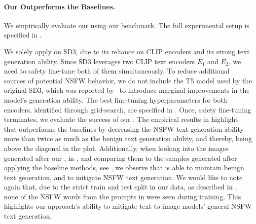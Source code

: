 \paragraph{Our \ours Outperforms the Baselines.}
We empirically evaluate our \ours using our \bench benchmark. The full experimental setup is specified in .

We solely apply \ours on SD3, due to its reliance on CLIP encoders and its strong text generation ability. 
Since SD3 leverages two CLIP text encoders \textit{$E_1$} and \textit{$E_2$}, we need to safety fine-tune both of them simultaneously. 
To reduce additional sources of potential NSFW behavior, we do not include the T5 model used by the original SD3, which was reported by~\citet{esser2024scalingSD3} to introduce marginal improvements in the model's generation ability.
The best fine-tuning hyperparameters for both encoders, identified through grid-search, are specified in .
Once, safety fine-tuning terminates, we evaluate the success of our \ours. The empirical results in  highlight that \ours outperforms the baselines by decreasing the NSFW text generation ability more than twice as much as the benign text generation ability, and thereby, being above the diagonal in the plot.
Additionally, when looking into the images generated after our \ours, in , and comparing them to the samples generated after applying the baseline methods, see , we observe that \ours is able to maintain benign text generation, and to mitigate NSFW text generation. We would like to note again that, due to the strict train and test split in our data, as described in , none of the NSFW words from the prompts in   were seen during training. This highlights our approach's ability to mitigate text-to-image models' general NSFW text generation.
